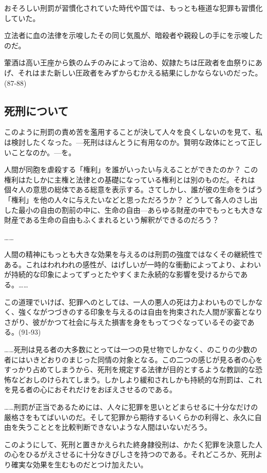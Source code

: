 おそろしい刑罰が習慣化されていた時代や国では、もっとも極道な犯罪も習慣化していた。

立法者に血の法律を示唆したその同じ気風が、暗殺者や親殺しの手にを示唆したのだ。

葷酒は高い王座から鉄のムチのみによって治め、奴隷たちは圧政者を血祭りにあげ、それはまた新しい圧政者をみずからむかえる結果にしかならないのだった。(87-88)

\subsection{死刑について}

このように刑罰の責め苦を濫用することが決して人々を良くしないのを見て、私は検討したくなった。{\——}死刑はほんとうに有用なのか。賢明な政体にとって正しいことなのか。{\——}を。

人間が同胞を虐殺する「権利」を誰がいったい与えることができたのか？ この権利はたしかに主権と法律との基礎になっている権利とは別のものだ。それは個々人の意思の総体である総意を表示する。さてしかし、誰が彼の生命をうばう「権利」を他の人々に与えたいなどと思っただろうか？ どうして各人のさし出した最小の自由の割前の中に、生命の自由{\——}あらゆる財産の中でもっとも大きな財産である生命の自由もふくまれるという解釈ができるのだろう？

……

人間の精神にもっとも大きな効果を与えるのは刑罰の強度ではなくその継続性である。これはわれわれの感性が、はげしいが一時的な衝動によってより、よわいが持続的な印象によってずっとたやすくまた永続的な影響を受けるからである。……

この道理でいけば、犯罪へのとしては、一人の悪人の死は力よわいものでしかなく、強くながつづきのする印象を与えるのは自由を拘束された人間が家畜となりさがり、彼がかつて社会に与えた損害を身をもってつぐなっているその姿である。(91-93)

……死刑は見る者の大多数にとっては一つの見せ物でしかなく、のこりの少数の者にはいきどおりのまじった同情の対象となる。この二つの感じが見る者の心をすっかり占めてしまうから、死刑を規定する法律が目的とするような教訓的な恐怖などおしのけられてしまう。しかしより緩和されしかも持続的な刑罰は、これを見る者の心におそれだけをおぼえさせるのである。

……刑罰が正当であるためには、人々に犯罪を思いとどまらせるに十分なだけの厳格さをもてばいいのだ。そして犯罪から期待するいくらかの利得と、永久に自由を失うこととを比較判断できないような人間はいないだろう。

このようにして、死刑と置きかえられた終身隷役刑は、かたく犯罪を決意した人の心をひるがえさせるに十分なきびしさを持つのである。それどころか、死刑より確実な効果を生むものだとつけ加えたい。

